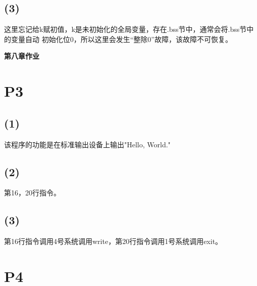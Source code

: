 \documentclass{article}
\begin{document}
\begin{figure}[htbp]
	\centering
	\quad
\end{figure}
\subsection*{(3)}
这里忘记给k赋初值，k是未初始化的全局变量，存在.bss节中，通常会将.bss节中的变量自动
初始化位0，所以这里会发生“整除0”故障，该故障不可恢复。
\newpage
\begin{center}
    \textbf{第八章作业}
\end{center}
\section*{P3}
\subsection*{(1)}
该程序的功能是在标准输出设备上输出"Hello, World."
\subsection*{(2)}
第16，20行指令。
\subsection*{(3)}
第16行指令调用4号系统调用write，第20行指令调用1号系统调用exit。
\section*{P4}
\end{document}
